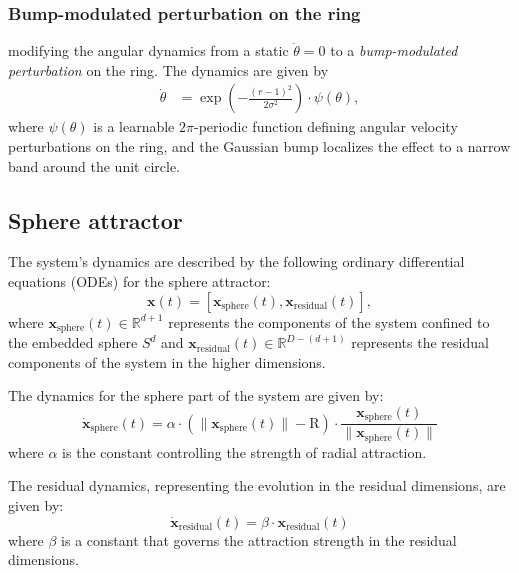 \documentclass{article}
\theoremstyle{definition} \newtheorem{definition}{Definition}  \newtheorem{example}{Example}
\theoremstyle{remark} \newtheorem{remark}{Remark}
\newcounter{ct}
\begin{document}
\subsubsection{Bump-modulated perturbation on the ring}
modifying the angular dynamics from a static $\dot\theta=0$ to a \emph{bump-modulated perturbation} on the ring.
The dynamics are given by
\begin{align}
\dot{\theta} &= \exp\left(-\frac{(r - 1)^2}{2\sigma^2} \right) \cdot \psi(\theta), \label{eq:bumpmod_angular}
\end{align}
where \( \psi(\theta) \) is a learnable \( 2\pi \)-periodic function defining angular velocity perturbations on the ring, and the Gaussian bump localizes the effect to a narrow band around the unit circle.


\subsection{Sphere attractor}\label{sec:sa}
The system's dynamics are described by the following ordinary differential equations (ODEs) for the sphere attractor:
\begin{equation}
 \mathbf{x}(t) = \left[ \mathbf{x}_{\text{sphere}}(t), \mathbf{x}_{\text{residual}}(t) \right],
\end{equation}
 where \( \mathbf{x}_{\text{sphere}}(t) \in \mathbb{R}^{d+1} \) represents the components of the system confined to the embedded sphere \( S^d \) and \( \mathbf{x}_{\text{residual}}(t) \in \mathbb{R}^{D - (d+1)} \) represents the residual components of the system in the higher dimensions.

The dynamics for the sphere part of the system are given by:
\[
\dot{\mathbf{x}}_{\text{sphere}}(t) = \alpha \cdot \left( \| \mathbf{x}_{\text{sphere}}(t) \| - \text{R} \right) \cdot \frac{\mathbf{x}_{\text{sphere}}(t)}{\|\mathbf{x}_{\text{sphere}}(t)\|}
\]
where \( \alpha \) is the constant controlling the strength of radial attraction. 

The residual dynamics, representing the evolution in the residual dimensions, are given by:
\[
\dot{\mathbf{x}}_{\text{residual}}(t) = \beta \cdot \mathbf{x}_{\text{residual}}(t)
\]
where \( \beta \) is a constant that governs the attraction strength in the residual dimensions.
\end{document}
